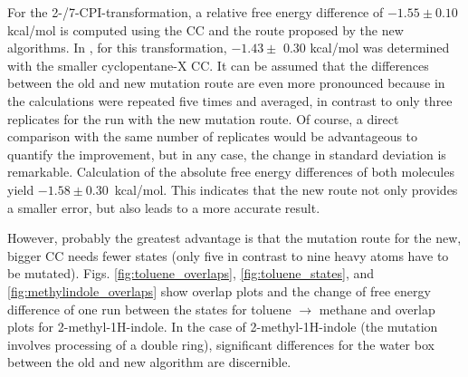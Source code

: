 For the 2-/7-CPI-transformation, a relative free energy difference of $-1.55 \pm  0.10$ kcal/mol is computed using the CC and the route proposed by the new algorithms. In \cite{Fleck.2021}, for this transformation, $-1.43  \pm $ 0.30 kcal/mol was determined with the smaller cyclopentane-X CC. It can be assumed that the differences between the old and new mutation route are even more pronounced because in \cite{Fleck.2021} the calculations were repeated five times and averaged, in contrast to only three replicates for the run with the new mutation route. 
Of course, a direct comparison with the same number of replicates would be advantageous to quantify the improvement, but in any case, the change in standard deviation is remarkable.
Calculation of the absolute free energy differences of both molecules yield $-1.58  \pm  0.30$~kcal/mol. This indicates that the new route not only provides a smaller error, but also leads to a more accurate result.

However, probably the greatest advantage is that the mutation route for the new, bigger CC needs fewer states (only five in contrast to nine heavy atoms have to be mutated). 
Figs. \ref{fig:toluene_overlaps}, \ref{fig:toluene_states}, and \ref{fig:methylindole_overlaps} show overlap plots and the change of free energy difference of one run between the states for toluene $\mathrm{\rightarrow}$ methane and overlap plots for 2-methyl-1H-indole. In the case of 2-methyl-1H-indole (the mutation involves processing of a double ring),  significant differences for the water box between the old and new algorithm are discernible.




